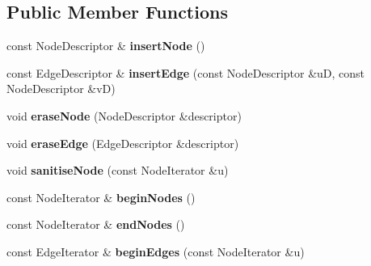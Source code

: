 \subsection*{Public Member Functions}
\begin{DoxyCompactItemize}
\item 
\hypertarget{class_adjacency_vector_impl_a48634c22797173ad4cac2e91e1ede28c}{
const NodeDescriptor \& {\bfseries insertNode} ()}
\label{class_adjacency_vector_impl_a48634c22797173ad4cac2e91e1ede28c}

\item 
\hypertarget{class_adjacency_vector_impl_a6d8e9ff2b7ba01649572f0f32411d06d}{
const EdgeDescriptor \& {\bfseries insertEdge} (const NodeDescriptor \&uD, const NodeDescriptor \&vD)}
\label{class_adjacency_vector_impl_a6d8e9ff2b7ba01649572f0f32411d06d}

\item 
\hypertarget{class_adjacency_vector_impl_a2062617a7fd696046dd877869157f8ed}{
void {\bfseries eraseNode} (NodeDescriptor \&descriptor)}
\label{class_adjacency_vector_impl_a2062617a7fd696046dd877869157f8ed}

\item 
\hypertarget{class_adjacency_vector_impl_a7ae0fd1a9b53aee9e3b3e3b80e48d8af}{
void {\bfseries eraseEdge} (EdgeDescriptor \&descriptor)}
\label{class_adjacency_vector_impl_a7ae0fd1a9b53aee9e3b3e3b80e48d8af}

\item 
\hypertarget{class_adjacency_vector_impl_a0833d355f471c0306ee4b40b6e588558}{
void {\bfseries sanitiseNode} (const NodeIterator \&u)}
\label{class_adjacency_vector_impl_a0833d355f471c0306ee4b40b6e588558}

\item 
\hypertarget{class_adjacency_vector_impl_a58893bf0b10c7160737c2cd5552d7469}{
const NodeIterator \& {\bfseries beginNodes} ()}
\label{class_adjacency_vector_impl_a58893bf0b10c7160737c2cd5552d7469}

\item 
\hypertarget{class_adjacency_vector_impl_af902c478ea67c419286ca44a4b9c1ddd}{
const NodeIterator \& {\bfseries endNodes} ()}
\label{class_adjacency_vector_impl_af902c478ea67c419286ca44a4b9c1ddd}

\item 
\hypertarget{class_adjacency_vector_impl_a91bf0b44b807b36d2193c75541e72b56}{
const EdgeIterator \& {\bfseries beginEdges} (const NodeIterator \&u)}
\label{class_adjacency_vector_impl_a91bf0b44b807b36d2193c75541e72b56}


\end{DoxyCompactItemize}
